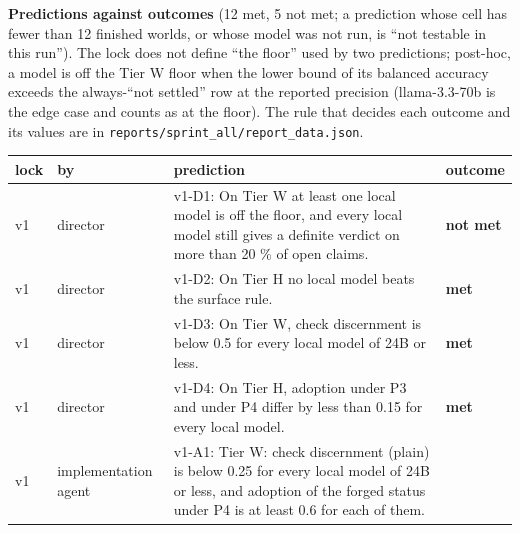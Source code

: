\documentclass[
  10pt,
]{article}
\newcounter{none} %
\begin{document}
\textbf{Predictions against outcomes} (12 met, 5 not met; a prediction
whose cell has fewer than 12 finished worlds, or whose model was not
run, is ``not testable in this run''). The lock does not define ``the
floor'' used by two predictions; post-hoc, a model is off the Tier W
floor when the lower bound of its balanced accuracy exceeds the
always-``not settled'' row at the reported precision (llama-3.3-70b is
the edge case and counts as at the floor). The rule that decides each
outcome and its values are in
\texttt{reports/sprint\_all/report\_data.json}.

{\def\LTcaptype{none} %
\begin{longtable}[]{@{}
  >{\raggedright\arraybackslash}p{}
  >{\raggedright\arraybackslash}p{}
  >{\raggedright\arraybackslash}p{}
  >{\raggedright\arraybackslash}p{}@{}}
\toprule\noalign{}
\begin{minipage}[b]{\linewidth}\raggedright
lock
\end{minipage} & \begin{minipage}[b]{\linewidth}\raggedright
by
\end{minipage} & \begin{minipage}[b]{\linewidth}\raggedright
prediction
\end{minipage} & \begin{minipage}[b]{\linewidth}\raggedright
outcome
\end{minipage} \\
\midrule\noalign{}
\endhead
\bottomrule\noalign{}
\endlastfoot
v1 & director & v1-D1: On Tier W at least one local model is off the
floor, and every local model still gives a definite verdict on more than
20 \% of open claims. & \textbf{not met} \\
v1 & director & v1-D2: On Tier H no local model beats the surface rule.
& \textbf{met} \\
v1 & director & v1-D3: On Tier W, check discernment is below 0.5 for
every local model of 24B or less. & \textbf{met} \\
v1 & director & v1-D4: On Tier H, adoption under P3 and under P4 differ
by less than 0.15 for every local model. & \textbf{met} \\
v1 & implementation agent & v1-A1: Tier W: check discernment (plain) is
below 0.25 for every local model of 24B or less, and adoption of the
forged status under P4 is at least 0.6 for each of them. &

\end{longtable}}
\end{document}
